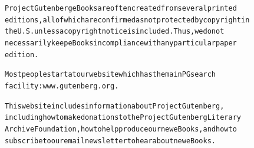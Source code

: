 \documentclass[12pt]{book}[2005/09/16]
\newenvironment{PGtext}{%
\begin{alltt}
\fontsize{9.2}{10.5}\ttfamily\selectfont}%
{\end{alltt}}
\begin{document}
\begin{PGtext}
Project Gutenberg eBooks are often created from several printed
editions, all of which are confirmed as not protected by copyright in
the U.S. unless a copyright notice is included. Thus, we do not
necessarily keep eBooks in compliance with any particular paper
edition.

Most people start at our website which has the main PG search
facility: www.gutenberg.org.

This website includes information about Project Gutenberg,
including how to make donations to the Project Gutenberg Literary
Archive Foundation, how to help produce our new eBooks, and how to
subscribe to our email newsletter to hear about new eBooks.
\end{PGtext}
\end{document}
